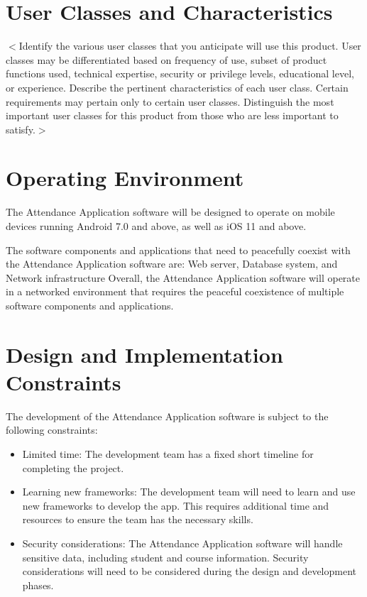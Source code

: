 \documentclass{scrreprt}
\begin{document}
\section{User Classes and Characteristics}
$<$Identify the various user classes that you anticipate will use this product.  
User classes may be differentiated based on frequency of use, subset of product 
functions used, technical expertise, security or privilege levels, educational 
level, or experience. Describe the pertinent characteristics of each user class.  
Certain requirements may pertain only to certain user classes. Distinguish the 
most important user classes for this product from those who are less important 
to satisfy.$>$

\section{Operating Environment}
The Attendance Application software will be designed to operate on mobile devices running Android 7.0 and above, as well as iOS 11 and above.

The software components and applications that need to peacefully coexist with the Attendance Application software are: Web server, Database system, and Network infrastructure
Overall, the Attendance Application software will operate in a networked environment that requires the peaceful coexistence of multiple software components and applications.


\section{Design and Implementation Constraints}
The development of the Attendance Application software is subject to the following constraints:
\begin{itemize}
\item Limited time: The development team has a fixed short timeline for completing the
project.
\item Learning new frameworks: The development team will need to learn and use new
frameworks to develop the app. This requires
additional time and resources to ensure the team has the necessary skills.
\item Security considerations: The Attendance Application software will handle sensitive data, including student and course information. Security considerations will need to be considered during the design and development phases.
\end{itemize}
\end{document}
